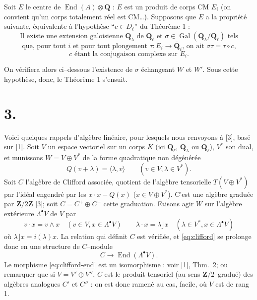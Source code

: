 \documentclass[11pt,a4paper]{article}
\theoremstyle{plain}
\theoremstyle{definition}
\DeclareMathOperator{\Gal}{Gal}
\DeclareMathOperator{\End}{End}
\begin{document}
Soit $E$ le centre de $\End(A) \otimes \mathbf{Q}$ : $E$ est un produit de corps CM $E_i$ (on convient qu'un corps totalement r\'eel est CM\ldots). Supposons que $E$ a la propri\'et\'e suivante, \'equivalente \`a l'hypoth\`ese ``$c \in D_\ell$'' du Th\'eor\`eme 1 :
\begin{equation}\label{eq:hyp}
\text{Il existe une extension galoisienne $\mathbf{Q}_\lambda$ de $\mathbf{Q}_\ell$ et $\sigma \in \Gal(\mathbf{Q}_\lambda/\mathbf{Q}_\ell)$ tels}
\end{equation}
\[
\text{que, pour tout $i$ et pour tout plongement $\tau : E_i \to \overline{\mathbf{Q}}_\ell$, on ait $\sigma\tau = \tau \circ c$,}
\]
\[
c \text{ \'etant la conjugaison complexe sur } E_i .
\]

On v\'erifiera alors ci--dessous l'existence de $\sigma$ \'echangeant $W$ et $W'$. Sous cette hypoth\`ese, donc, le Th\'eor\`eme 1 s'ensuit.

\section*{3.}

Voici quelques rappels d'alg\`ebre lin\'eaire, pour lesquels nous renvoyons \`a [3], bas\'e sur [1]. Soit $V$ un espace vectoriel sur un corps $K$ (ici $\mathbf{Q}_\ell$, $\mathbf{Q}_\lambda$ ou $\mathbf{Q}_\ell$), $V^*$ son dual, et munissons $W = V \oplus V^*$ de la forme quadratique non d\'eg\'en\'er\'ee
\[
Q(v + \lambda) = \langle \lambda, v \rangle \qquad (v \in V, \lambda \in V^*) .
\]
Soit $C$ l'alg\`ebre de Clifford associ\'ee, quotient de l'alg\`ebre tensorielle $T(V \oplus V^*)$ par l'id\'eal engendr\'e par les $x \cdot x - Q(x)$ ($x \in V \oplus V^*$). C'est une alg\`ebre gradu\'ee par $\mathbf{Z}/2\mathbf{Z}$ [3]; soit $C = C^+ \oplus C^-$ cette graduation. Faisons agir $W$ sur l'alg\`ebre ext\'erieure $\Lambda^\bullet V$ de $V$ par
\begin{equation}\label{eq:clifford}
v \cdot x = v \wedge x \quad (v \in V, x \in \Lambda^\bullet V) \qquad
\lambda \cdot x = \lambda \rfloor x \quad (\lambda \in V^*, x \in \Lambda^\bullet V)
\end{equation}
o\`u $\lambda \rfloor x = i(\lambda)x$. La relation qui d\'efinit $C$ est v\'erifi\'ee, et \eqref{eq:clifford} se prolonge donc en une structure de $C$--module
\begin{equation}\label{eq:clifford-end}
C \longrightarrow \End(\Lambda^\bullet V) .
\end{equation}
Le morphisme \eqref{eq:clifford-end} est un isomorphisme : voir [1], Thm.~2; ou remarquer que si $V = V' \oplus V''$, $C$ est le produit tensoriel (au sens $\mathbf{Z}/2$--gradu\'e) des alg\`ebres analogues $C'$ et $C''$ : on est donc ramen\'e au cas, facile, o\`u $V$ est de rang 1.
\end{document}
